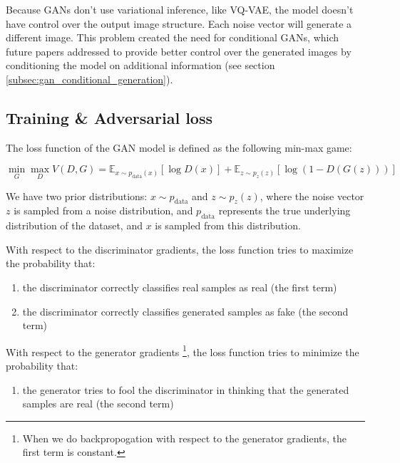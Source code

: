 Because GANs don't use variational inference, like VQ-VAE, the model doesn't have control over the output image structure. Each noise vector will generate a different image. This problem created the need for conditional GANs, which future papers addressed to provide better control over the generated images by conditioning the model on additional information (see section \ref{subsec:gan_conditional_generation}).




\subsection{Training \& Adversarial loss}
\label{subsec:gan_training}

The loss function of the GAN model is defined as the following min-max game:

\begin{equation}
    \label{eq:gan_loss}
    \min_G \max_D V(D,G) = \mathbb{E}_{x \sim p_{\text{data}}(x)}[\log D(x)] + \mathbb{E}_{z \sim p_z(z)}[\log(1 - D(G(z)))]
\end{equation}

We have two prior distributions: $x \sim p_{\text{data}}$ and $z \sim p_z(z)$, where the noise vector $z$ is sampled from a noise distribution, and $p_{\text{data}}$ represents the true underlying distribution of the dataset, and $x$ is sampled from this distribution.

With respect to the discriminator gradients, the loss function tries to maximize the probability that:

\begin{enumerate}
    \item the discriminator correctly classifies real samples as real (the first term)
    \item the discriminator correctly classifies generated samples as fake (the second term)
\end{enumerate}


With respect to the generator gradients \footnote{When we do backpropogation with respect to the generator gradients, the first term is constant.}, the loss function tries to minimize the probability that:

\begin{enumerate}
    \item the generator tries to fool the discriminator in thinking that the generated samples are real (the second term)
\end{enumerate}


